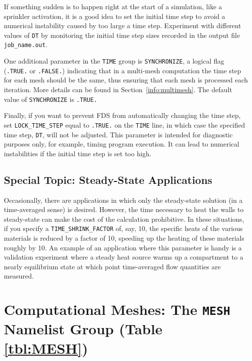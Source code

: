 \documentclass[11pt]{book}
\newcommand{\ct}{\tt\small}
\begin{document}
\begin{warning}
If something sudden is to happen right at the start of a simulation,
like a sprinkler activation, it is a good idea to set the initial time step
to avoid a numerical instability caused by too large a time step.
Experiment with different values of {\ct DT} by monitoring the initial time step sizes
recorded in the output file {\ct job\_name.out}.
\end{warning}

\noindent
One additional parameter in the {\ct TIME} group is {\ct SYNCHRONIZE}, a
logical flag ({\ct .TRUE.} or {\ct .FALSE.}) indicating that in a
multi-mesh computation the time step for each mesh should be the same, thus
ensuring that each mesh is processed each iteration. More details can
be found in Section~\ref{info:multimesh}. The default value of {\ct SYNCHRONIZE} is {\ct .TRUE.}

Finally, if you want to prevent FDS from automatically changing the time step, set {\ct LOCK\_TIME\_STEP} equal to {\ct .TRUE.}
on the {\ct TIME} line, in which case the specified
time step, {\ct DT}, will not be adjusted.
This parameter is intended for diagnostic purposes only, for example, timing program execution. It can lead to
numerical instabilities if the initial time step is set too high.



\subsection{Special Topic: Steady-State Applications}
\label{info:steady_state}

Occasionally, there are applications in which only the steady-state solution (in a time-averaged sense) is desired. However, the time necessary to
heat the walls to steady-state can make the cost of the calculation prohibitive. In these situations, if you specify a
{\ct TIME\_SHRINK\_FACTOR} of, say, 10, the specific heats of the various materials is reduced by a factor of 10, speeding up the heating
of these materials roughly by 10. An example of an application where this parameter is handy is a validation experiment where a steady heat source
warms up a compartment to a nearly equilibrium state at which point time-averaged flow quantities are measured.



\newpage

\section{Computational Meshes: The \texorpdfstring{{\tt MESH}}{MESH} Namelist Group (Table \ref{tbl:MESH})}
\label{info:MESH}
\end{document}
